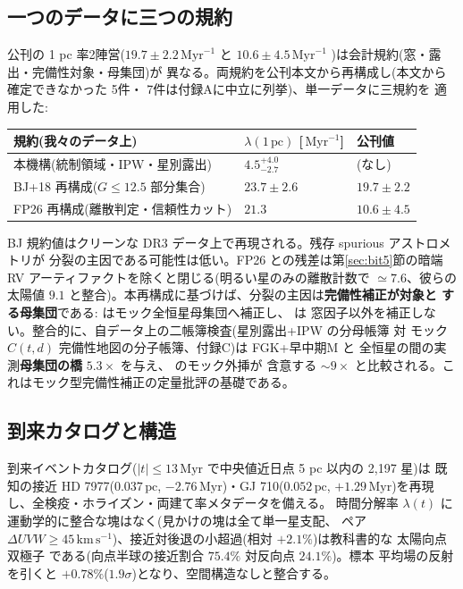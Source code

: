 \documentclass[11pt]{article}
\newcommand{\Myr}{\,\mathrm{Myr}}
\newcommand{\pc}{\,\mathrm{pc}}
\newcommand{\kms}{\,\mathrm{km\,s^{-1}}}
\newcommand{\lam}{\lambda}
\begin{document}
\subsection{一つのデータに三つの規約}
公刊の 1 pc 率2陣営($19.7\pm2.2\Myr^{-1}$ \cite{bj18} と
$10.6\pm4.5\Myr^{-1}$ \cite{fp26})は会計規約(窓・露出・完備性対象・母集団)が
異なる。両規約を公刊本文から再構成し(本文から確定できなかった \cite{bj18} 5件・
\cite{fp26} 7件は付録Aに中立に列挙)、単一データに三規約を
適用した:

\begin{center}
\begin{tabular}{lll}
\toprule
規約(我々のデータ上) & $\lam(1\pc)$ [$\Myr^{-1}$] & 公刊値 \\
\midrule
本機構(統制領域・IPW・星別露出) & $4.5^{+4.0}_{-2.7}$ & (なし) \\
BJ+18 再構成($G\le12.5$ 部分集合) & $23.7\pm2.6$ & $19.7\pm2.2$ \\
FP26 再構成(離散判定・信頼性カット) & $21.3$ & $10.6\pm4.5$ \\
\bottomrule
\end{tabular}
\end{center}

BJ 規約値はクリーンな DR3 データ上で再現される。残存 spurious アストロメトリが
分裂の主因である可能性は低い。FP26 との残差は第\ref{sec:bit5}節の暗端 RV
アーティファクトを除くと閉じる(明るい星のみの離散計数で $\simeq7.6$、彼らの
太陽値 $9.1$ と整合)。本再構成に基づけば、分裂の主因は\textbf{完備性補正が対象と
する母集団}である: \cite{bj18} はモック全恒星母集団へ補正し、\cite{fp26} は
窓因子以外を補正しない。整合的に、自データ上の二帳簿検査(星別露出+IPW の分母帳簿 対
モック $C(t,d)$ 完備性地図の分子帳簿、付録C)は FGK+早中期M と
全恒星の間の実測\textbf{母集団の橋} $5.3\times$ を与え、\cite{bj18} のモック外挿が
含意する $\sim9\times$ と比較される。これはモック型完備性補正の定量批評の基礎である。

\subsection{到来カタログと構造}
到来イベントカタログ($|t|\le13\Myr$ で中央値近日点 5 pc 以内の 2{,}197 星)は
既知の接近 HD 7977($0.037\pc$, $-2.76\Myr$)・GJ 710($0.052\pc$,
$+1.29\Myr$)を再現し、全検疫・ホライズン・両建て率メタデータを備える。
時間分解率 $\lam(t)$ に運動学的に整合な塊はなく(見かけの塊は全て単一星支配、
ペア $\Delta UVW\ge45\kms$)、接近対後退の小超過(相対 $+2.1\%$)は教科書的な
太陽向点双極子 \cite{schoenrich10} である(向点半球の接近割合 $75.4\%$ 対反向点 $24.1\%$)。標本
平均場の反射を引くと $+0.78\%$($1.9\sigma$)となり、空間構造なしと整合する。
\end{document}
